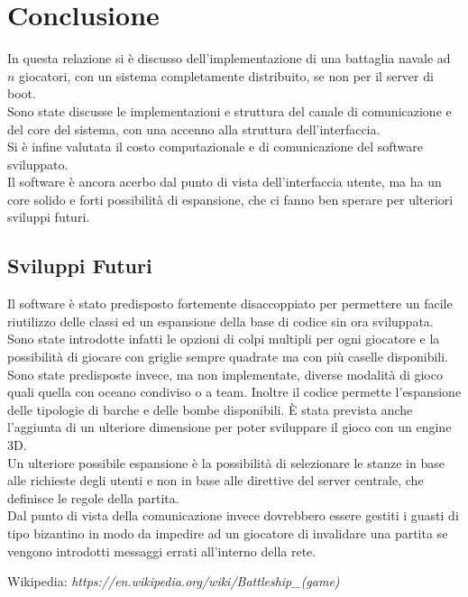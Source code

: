 \documentclass{llncs}
\begin{document}
\section{Conclusione}
In questa relazione si è discusso dell'implementazione di una battaglia navale ad $n$ giocatori, con un sistema completamente distribuito, se non per il server di boot.\\
Sono state discusse le implementazioni e struttura del canale di comunicazione e del core del sistema, con una accenno alla struttura dell'interfaccia.\\
Si è infine valutata il costo computazionale e di comunicazione del software sviluppato.\\
Il software è ancora acerbo dal punto di vista dell'interfaccia utente, ma ha un core solido e forti possibilità di espansione, che ci fanno ben sperare per ulteriori sviluppi futuri.
\subsection{Sviluppi Futuri}
Il software è stato predisposto fortemente disaccoppiato per permettere un facile riutilizzo delle classi ed un espansione della base di codice sin ora sviluppata.\\
Sono state introdotte infatti le opzioni di colpi multipli per ogni giocatore e la possibilità di giocare con griglie sempre quadrate ma con più caselle disponibili.\\
Sono state predisposte invece, ma non implementate, diverse modalità di gioco quali quella con oceano condiviso o a team. Inoltre il codice permette l'espansione delle tipologie di barche e delle bombe disponibili. È stata prevista anche l'aggiunta di un ulteriore dimensione per poter sviluppare il gioco con un engine 3D. \\
Un ulteriore possibile espansione è la possibilità di selezionare le stanze in base alle richieste degli utenti e non in base alle direttive del server centrale, che definisce le regole della partita.\\
Dal punto di vista della comunicazione invece dovrebbero essere gestiti i guasti di tipo bizantino in modo da impedire ad un giocatore di invalidare una partita se vengono introdotti messaggi errati all'interno della rete.
%
%
\begin{thebibliography}{3}
%
Wikipedia: 
\emph{https://en.wikipedia.org/wiki/Battleship\_(game)}


\end{thebibliography}

%
\end{document}
